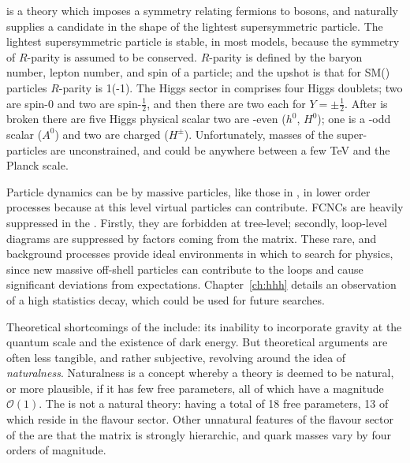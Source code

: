 \SUSY is a theory which imposes a symmetry relating fermions to bosons, and naturally supplies a
\dm candidate in the shape of the lightest supersymmetric
particle.
The lightest supersymmetric particle is stable, in most models, because the symmetry of $R$-parity
is assumed to be conserved.
$R$-parity is  defined by the baryon number, lepton number, and spin of a particle; and the
upshot is that for SM(\SUSY) particles $R$-parity is 1(-1).
The Higgs sector in \SUSY comprises four Higgs doublets; two are spin-0 and two are spin-$\tfrac12$,
and then there are two each for $Y=\pm\tfrac12$.
After \SUSY is broken there are five Higgs physical scalar  two are \CP-even ($h^0$,
$H^0$); one is a \CP-odd scalar ($A^0$) and two are charged ($H^\pm$).
Unfortunately, masses of the super-particles are unconstrained, and could be anywhere between a few
TeV and the Planck scale.


Particle dynamics can be  by massive \np particles, like those in \SUSY, in lower order
processes because at this level virtual particles can contribute.
\glspl{FCNC} are heavily suppressed in the \sm.
Firstly, they are forbidden at tree-level; secondly, loop-level diagrams are suppressed by factors
coming from the \ckm matrix.
These rare, and  background processes provide ideal environments in which to search for \bsm
physics, since new massive off-shell particles can contribute to the loops and cause significant
deviations from \sm expectations.
Chapter~\ref{ch:hhh} details an observation of a high statistics \fcnc decay,
which could be used for future \np searches.



Theoretical shortcomings of the \sm include: its inability to incorporate gravity at the quantum
scale and the existence of dark energy.
But theoretical arguments are often less tangible, and
rather subjective, revolving around the idea of \emph{naturalness}.
Naturalness is a concept whereby a theory is deemed to be natural, or more plausible, if it has few
free parameters, all of which have a magnitude $\mathcal{O}(1)$.
The \sm is not a natural theory: having
a total of 18 free parameters, 13 of which reside in the flavour
sector.
Other unnatural features of the flavour sector of the \sm are that the \ckm matrix is strongly
hierarchic, and quark masses vary by four orders of magnitude.

